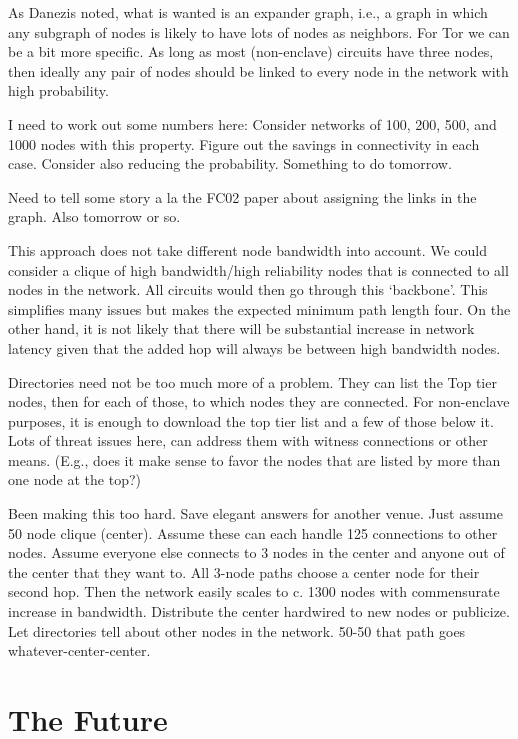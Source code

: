\documentclass{llncs}
\begin{document}
As Danezis noted, what is wanted is an expander graph, i.e., a graph
in which any subgraph of nodes is likely to have lots of nodes as
neighbors. For Tor we can be a bit more specific. As long as most
(non-enclave) circuits have three nodes, then ideally any pair of nodes
should be linked to every node in the network with high probability.

I need to work out some numbers here: Consider networks of 100,
200, 500, and 1000 nodes with this property. Figure out the savings
in connectivity in each case. Consider also reducing the probability.
Something to do tomorrow.

Need to tell some story a la the FC02 paper about assigning the
links in the graph. Also tomorrow or so.

This approach does not take different node bandwidth into account. We
could consider a clique of high bandwidth/high reliability nodes that
is connected to all nodes in the network. All circuits would then go
through this `backbone'. This simplifies many issues but makes the
expected minimum path length four. On the other hand, it is not
likely that there will be substantial increase in network latency
given that the added hop will always be between high bandwidth nodes.

Directories need not be too much more of a problem. They can list the
Top tier nodes, then for each of those, to which nodes they are
connected.  For non-enclave purposes, it is enough to download the top
tier list and a few of those below it.  Lots of threat issues here,
can address them with witness connections or other means. (E.g., does
it make sense to favor the nodes that are listed by more than one node
at the top?)

Been making this too hard. Save elegant answers for another venue.
Just assume 50 node clique (center).  Assume these can each handle 125
connections to other nodes. Assume everyone else connects to 3 nodes
in the center and anyone out of the center that they want to. All
3-node paths choose a center node for their second hop. Then the
network easily scales to c. 1300 nodes with commensurate increase in
bandwidth. Distribute the center hardwired to new nodes or publicize.
Let directories tell about other nodes in the network.  50-50 that
path goes whatever-center-center.


\section{The Future}
\label{sec:conclusion}


 
\end{document}
